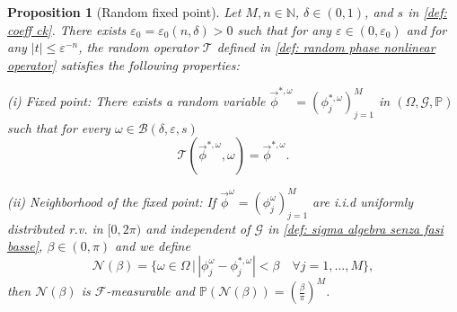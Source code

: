 \documentclass[a4paper,10pt,reqno]{article}
\theoremstyle{definition}
\theoremstyle{plain}
\theoremstyle{plain}
\theoremstyle{definition}
\theoremstyle{plain}
\theoremstyle{plain}
\newtheorem{prop}[definition]{Proposition}
\theoremstyle{plain}
\theoremstyle{definition}
\theoremstyle{definition}
\newcommand{\norm}[1]{\left\lVert #1 \right\rVert}
\def \N{\mathbb N}
\def \R{\mathbb R}
\def \P{{\mathbb P}}
\begin{document}
\begin{prop}[Random fixed point] \label{prop: properties of random fixed point}
Let $M,n \in \N$, $\delta \in (0,1)$, 
and $s$ in \eqref{def: coeff ck}.
There exists $\varepsilon_0 = \varepsilon_0(n,\delta) > 0$ such that for any $\varepsilon \in (0,\varepsilon_0)$ and for any $|t| \le \varepsilon^{-n}$, the random operator $\mathcal{T}$ defined in \eqref{def: random phase nonlinear operator} satisfies the following properties:

\medskip




\smallskip

\noindent (i) {\sc Fixed point:} There exists a random variable $\vec{\phi}^{*,\omega} = ( \phi_j^{*,\omega} )_{j=1}^M$ in $(\mathbb{\Omega},\mathcal{G},\mathbb{P})$ such that for every $\omega\in \mathcal{B}(\delta,\varepsilon,s)$
\[
\mathcal{T} ( \vec{\phi}^{*,\omega} , \omega ) = \vec{\phi}^{*,\omega}.
\]

\smallskip

\noindent (ii) {\sc Neighborhood of the fixed point:} If $\vec{\phi}^{\omega} = (\phi_j^{\omega})_{j=1}^M$ are i.i.d uniformly distributed r.v. in $[0,2\pi)$ and independent of $\mathcal{G}$ in \eqref{def: sigma algebra senza fasi basse}, $\beta \in (0,\pi)$ and we define
\begin{equation} \label{def: intorno}
\mathcal{N}(\beta) = \{ \omega \in \mathbb{\Omega} \, \big \lvert \, | \phi_j^{\omega} - \phi_j^{*,\omega} | < \beta \quad \forall j = 1,\ldots,M \},
\end{equation}
then $\mathcal{N}(\beta)$ is $\mathcal{F}$-measurable and $\P(\mathcal{N}(\beta)) = \left ( \frac{\beta}{\pi} \right )^M$.


\end{prop}
\end{document}
